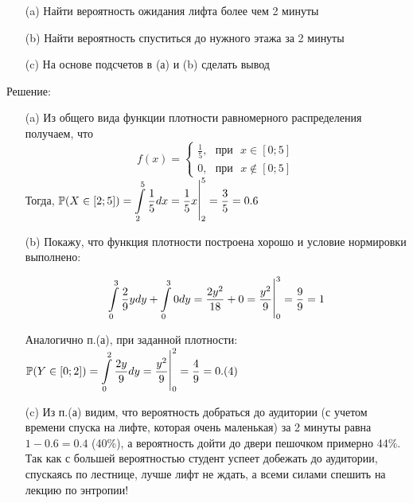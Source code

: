\documentclass[a4paper,11pt]{article}
\begin{document}
	\begin{enumerate}
		\item [(a)] Найти вероятность ожидания лифта более чем 2 минуты
		\item [(b)] Найти вероятность спуститься до нужного этажа за 2 минуты
		\item [(c)] На основе подсчетов в (а) и (b) сделать вывод
	\end{enumerate}

	\begin{center}
		{\large Решение:}
	\end{center}

	\begin{enumerate}
		\item [(a)] 
		Из общего вида функции плотности равномерного распределения получаем, что
		\[
		f(x) = 	\begin{cases}
		\frac{1}{5}, \text{ } \text{при} \text{ } x\in[0;5] \\ 
		0, \text{ } \text{при} \text{ } x\notin[0;5]
		\end{cases} 
		\]
		Тогда, $ \mathbb{P}(X\in[2;5]) =  \Large \displaystyle \int\limits_{2}^{5}\dfrac{1}{5}dx = \dfrac{1}{5}x\bigg|^{5}_{2}=\dfrac{3}{5}=0.6$
		
		\item [(b)] Покажу, что функция плотности построена хорошо и условие нормировки выполнено: 
		
		\[ 
		\Large \displaystyle \int\limits_{0}^{3}\dfrac{2}{9}ydy+\Large \displaystyle \int\limits_{0}^{3}0dy = \dfrac{2y^2}{18}+0=\dfrac{y^2}{9}\bigg|_{0}^{3}=\dfrac{9}{9}=1
		\]
		
		Аналогично п.(а), при заданной плотности: $ \mathbb{P}(Y\in[0;2]) = \Large \displaystyle \int\limits_{0}^{2}\dfrac{2y}{9}dy = \dfrac{y^2}{9}\bigg|_{0}^{2}=\dfrac{4}{9}=0.(4)$
		
		\item [(c)] Из п.(а) видим, что вероятность добраться до аудитории (с учетом времени спуска на лифте, которая очень маленькая) за 2 минуты равна $ 1 - 0.6 = 0.4 $ (40\%), а вероятность дойти до двери пешочком примерно 44\%. Так как с большей вероятностью студент успеет добежать до аудитории, спускаясь по лестнице, лучше лифт не ждать, а всеми силами спешить на лекцию по энтропии! 
	\end{enumerate}
\end{document}
